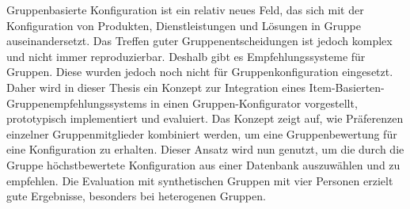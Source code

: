 \Abstract

Gruppenbasierte Konfiguration ist ein relativ neues Feld, das sich mit der Konfiguration von Produkten, Dienstleistungen und Lösungen in Gruppe auseinandersetzt. Das Treffen guter Gruppenentscheidungen ist jedoch komplex und nicht immer reproduzierbar. Deshalb gibt es Empfehlungssysteme für Gruppen. Diese wurden jedoch noch nicht für Gruppenkonfiguration eingesetzt. Daher wird in dieser Thesis ein Konzept zur Integration eines Item-Basierten-Gruppenempfehlungssystems in einen Gruppen-Konfigurator vorgestellt, prototypisch implementiert und evaluiert. Das Konzept zeigt auf, wie Präferenzen einzelner Gruppenmitglieder kombiniert werden, um eine Gruppenbewertung für eine Konfiguration zu erhalten. Dieser Ansatz wird nun genutzt, um die durch die Gruppe höchstbewertete Konfiguration aus einer Datenbank auszuwählen und zu empfehlen. Die Evaluation mit synthetischen Gruppen mit vier Personen erzielt gute Ergebnisse, besonders bei heterogenen Gruppen.